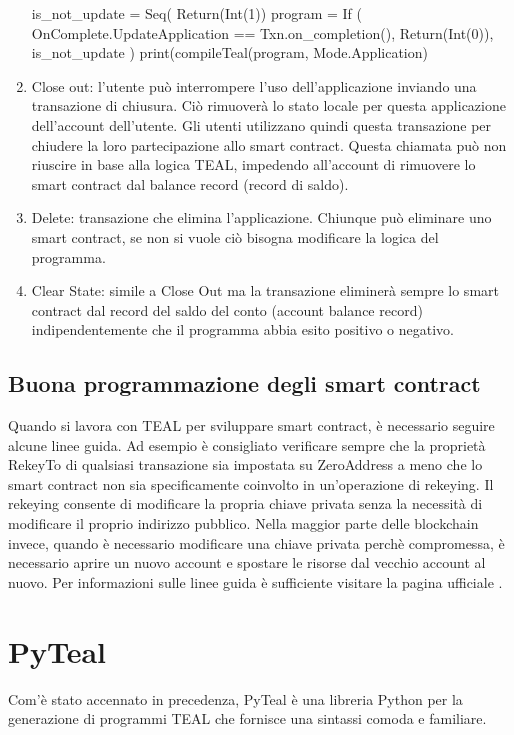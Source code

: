 \begin{enumerate}
    \begin{pythoncode}
    is_not_update = Seq( Return(Int(1))
    program = If (
     OnComplete.UpdateApplication == Txn.on_completion(),
     Return(Int(0)),
     is_not_update
    )
    print(compileTeal(program, Mode.Application)
    \end{pythoncode}
    
    \item Close out: l'utente può interrompere l'uso dell'applicazione inviando una transazione di chiusura. Ciò rimuoverà lo stato locale per questa applicazione dell'account dell'utente. Gli utenti utilizzano quindi questa transazione per chiudere la loro partecipazione allo smart contract. Questa chiamata può non riuscire in base alla logica TEAL, impedendo all'account di rimuovere lo smart contract dal balance record (record di saldo).
    \item Delete: transazione che elimina l'applicazione. Chiunque può eliminare uno smart contract, se non si vuole ciò bisogna modificare la logica del programma.
    \item Clear State: simile a Close Out ma la transazione eliminerà sempre lo smart contract dal record del saldo del conto (account balance record) indipendentemente che il programma abbia esito positivo o negativo.
\end{enumerate}

\subsection{Buona programmazione degli smart contract}
Quando si lavora con TEAL per sviluppare smart contract, è necessario seguire alcune linee guida. Ad esempio è consigliato verificare sempre che la proprietà RekeyTo di qualsiasi transazione sia impostata su ZeroAddress a meno che lo smart contract non sia specificamente coinvolto in un'operazione di rekeying. Il rekeying consente di modificare la propria chiave privata senza la necessità di modificare il proprio indirizzo pubblico. Nella maggior parte delle blockchain invece, quando è necessario modificare una chiave privata perchè compromessa, è necessario aprire un nuovo account e spostare le risorse dal vecchio account al nuovo. Per informazioni sulle linee guida è sufficiente visitare la pagina ufficiale \cite{guidelines}.

\section{PyTeal}
Com'è stato accennato in precedenza, PyTeal è una libreria Python per la generazione di programmi TEAL che fornisce una sintassi comoda e familiare.

